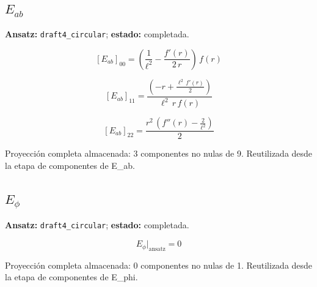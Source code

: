 \documentclass[11pt]{article}
\begin{document}
\subsection*{$ E_{ab} $}
\textbf{Ansatz:} \texttt{draft4\_circular}; \textbf{estado:} completada.\par
\begin{dmath*}[breakdepth={5}]
\left[E_{ab}\right]_{00} = \left(\frac{1}{{\ell}^{2}} - \frac{f'\!\left(r\right)}{2\,r}\right)\,f\!\left(r\right)
\end{dmath*}
\par\smallskip
\begin{dmath*}[breakdepth={5}]
\left[E_{ab}\right]_{11} = \frac{\left(-r + \frac{{\ell}^{2}\,f'\!\left(r\right)}{2}\right)}{{\ell}^{2}\,r\,f\!\left(r\right)}
\end{dmath*}
\par\smallskip
\begin{dmath*}[breakdepth={5}]
\left[E_{ab}\right]_{22} = \frac{{r}^{2}\,\left(f''\!\left(r\right) - \frac{2}{{\ell}^{2}}\right)}{2}
\end{dmath*}
\par\smallskip
Proyección completa almacenada: 3 componentes no nulas de 9. Reutilizada desde la etapa de componentes de E\_ab.\par\medskip
{}
\subsection*{$ E_{\phi} $}
\textbf{Ansatz:} \texttt{draft4\_circular}; \textbf{estado:} completada.\par
\begin{dmath*}[breakdepth={5}]
E_{\phi}\big|_{\mathrm{ansatz}} = 0
\end{dmath*}
\par\smallskip
Proyección completa almacenada: 0 componentes no nulas de 1. Reutilizada desde la etapa de componentes de E\_phi.\par\medskip
{}
\end{document}

